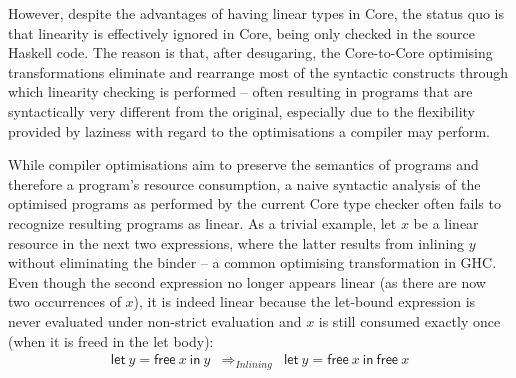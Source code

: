 \documentclass[acmsmall,review,screen]{acmart}
\newcommand{\llet}[2]{\mathsf{let}~#1~\mathsf{in}~#2}
\newcommand{\ROUNDTWO}[1]{{\color{red}#1}}
\begin{document}
%
\ROUNDTWO{However}, despite the advantages of \ROUNDTWO{having} linear types in Core, the status quo is
that linearity is effectively ignored in Core, being only checked
in the source Haskell code. The reason is that, \ROUNDTWO{after} desugaring, the
Core-to-Core optimising transformations eliminate and rearrange most of the
syntactic constructs through which linearity checking is performed -- often
resulting in programs that are syntactically very different from the original,
especially due to the flexibility provided by laziness with regard to the
optimisations a compiler may perform.

While compiler optimisations aim to preserve the semantics of
programs and therefore a program's resource consumption,
a naive syntactic analysis of the optimised programs as
performed by the current Core type checker often fails to recognize
\ROUNDTWO{resulting} programs as linear.
%
As a trivial example, let $x$ be a linear resource in the next two expressions,
where the latter results from inlining $y$ without eliminating the
binder -- a common optimising transformation in GHC. Even
though the second expression no longer appears linear (as there are now two occurrences
of $x$), it is indeed linear because the let-bound expression is never
evaluated under \ROUNDTWO{non-strict} evaluation and $x$ is still consumed exactly once (when it is freed in the let body):
%
\[
\begin{array}{ccc}
\llet{y = \textsf{free}~x}{y} & \Longrightarrow_{Inlining} & \llet{y = \textsf{free}~x}{\textsf{free}~x}
\end{array}
\]

\end{document}
